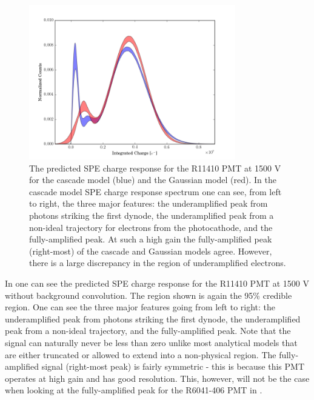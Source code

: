 \begin{figure}[t]
\centering
\includegraphics[width=9cm]{uc_spe_response.png}
\caption{The predicted SPE charge response for the R11410 PMT at 1500 V for the cascade model (blue) and the Gaussian model (red).  In the cascade model SPE charge response spectrum one can see, from left to right, the three major features: the underamplified peak from photons striking the first dynode, the underamplified peak from a non-ideal trajectory for electrons from the photocathode, and the fully-amplified peak.  At such a high gain the fully-amplified peak (right-most) of the cascade and Gaussian models agree.  However, there is a large discrepancy in the region of underamplified electrons.}
\label{fig:fig-2}
\end{figure}




In  one can see the predicted SPE charge response for the R11410 PMT at 1500 V without background convolution.  The region shown is again the 95\% credible region.  One can see the three major features going from left to right: the underamplified peak from photons striking the first dynode, the underamplified peak from a non-ideal trajectory, and the fully-amplified peak.  Note that the signal can naturally never be less than zero unlike most analytical models that are either truncated or allowed to extend into a non-physical region.  The fully-amplified signal (right-most peak) is fairly symmetric - this is because this PMT operates at high gain and has good resolution.  This, however, will not be the case when looking at the fully-amplified peak for the R6041-406 PMT in .




